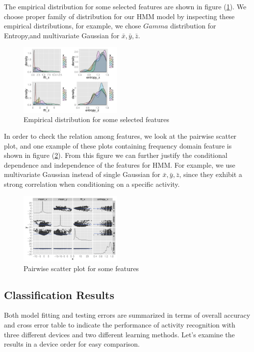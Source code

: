 The empirical distribution for some selected features are shown in figure (\ref{fig:features}). We choose proper family of distribution for our HMM model by inspecting these empirical distributions, for example, we chose $Gamma$ distribution for Entropy,and multivariate Gaussian for $\bar{x},\bar{y},\bar{z}$. 

\begin{figure}[h]
  \centering
  \includegraphics[width=0.45\textwidth]{figures/edafeature2.pdf}
  \caption{Empirical distribution for some selected features}
  \label{fig:features}
\end{figure}

In order to check the relation among features, we look at the pairwise scatter plot, and one  example of these plots containing frequency domain feature is shown in figure (\ref{fig:pairwise}). From this figure we can further justify the conditional dependence and independence of the features for HMM. For example, we use  multivariate Gaussian instead of 
single Gaussian for $\bar{x},\bar{y},\bar{z}$, since they exhibit a strong correlation when conditioning on a specific activity.
\begin{figure}[h]
  \centering
  \includegraphics[width=0.45\textwidth]{figures/edafeature1.pdf}
  \caption{Pairwise scatter plot for some features}
  \label{fig:pairwise}
\end{figure}


\subsection{Classification Results}

Both model fitting and testing errors are summarized in terms of overall accuracy and cross error table to indicate the performance of activity recognition with three different devices and two different learning methods. Let's examine the results in a device order for easy comparison.


